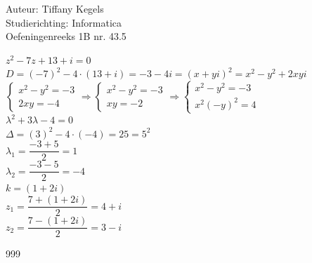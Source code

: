 \documentclass[a4paper]{article}
\begin{document}
  
\noindent \large Auteur: Tiffany Kegels \\
\noindent \large Studierichting: Informatica\\
\noindent \large Oefeningenreeks 1B nr. 43.5\\

\medskip

\normalsize

$z^2 - 7z + 13 + i = 0$\\

$D = (-7)^2 - 4 \cdot (13 + i) = -3-4i = (x+yi)^2 = x^2 - y^2 + 2xyi$\\

$\left\{
	\begin{array}{l} 
		x^2 - y^2 = -3\\
		2xy = -4
	\end{array}
\right .
\Rightarrow
\left\{
	\begin{array}{l} 
		x^2 - y^2 = -3\\
		xy = -2
	\end{array}
\right .
\Rightarrow
\left\{
	\begin{array}{l} 
		x^2 - y^2 = -3\\
		x^2(-y)^2 = 4
	\end{array}
\right .$\\

$\lambda^2 +3\lambda - 4 = 0$\\

$\Delta = (3)^2 -4\cdot(-4) = 25 = 5^2$\\

$\lambda_1 = \dfrac{-3+5}{2} = 1$\\

$\lambda_2 = \dfrac{-3-5}{2} = -4$\\

$k = (1+2i)$\\

$z_1 = \dfrac{7 + (1+2i)}{2} = 4+i$\\

$z_2 = \dfrac{7 - (1+2i)}{2} = 3-i$\\

\begin{thebibliography}{999}

\end{thebibliography}
\end{document}
